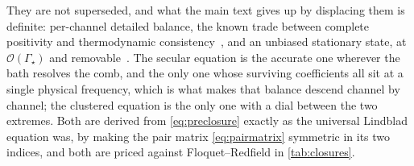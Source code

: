\documentclass[a4paper,11pt]{article}
\begin{document}
They are not superseded, and what the main text gives up by displacing them is definite: per-channel detailed balance, the known trade between complete positivity and thermodynamic consistency~\cite{Tupkary2022Fundamental,Soret2022Thermodynamic}, and an unbiased stationary state, at $\mathcal O(\Gamma_{\!\star})$ and removable~\cite{Nathan2024Quantifying}. The secular equation is the accurate one wherever the bath resolves the comb, and the only one whose surviving coefficients all sit at a single physical frequency, which is what makes that balance descend channel by channel; the clustered equation is the only one with a dial between the two extremes. Both are derived from \eqref{eq:preclosure} exactly as the universal Lindblad equation was, by making the pair matrix \eqref{eq:pairmatrix} symmetric in its two indices, and both are priced against Floquet--Redfield in \cref{tab:closures}.
\end{document}
